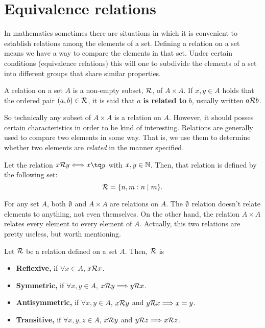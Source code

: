 \chapter{Equivalence relations}
In mathematics sometimes there are situations in which it is convenient to establish relations among the
elements of a set. Defining a relation on a set means we have a way to compare the elements in that set.
Under certain conditions (equivalence relations) this will one to subdivide the elements of a set into
different groups that share similar properties. \cite{chamizo02}

\begin{defi}[Relation]
    A relation on a set $A$ is a non-empty subset, $\mathcal{R}$, of $A\times A$. If $x, y\in A$ holds that
    the ordered pair $\left( a, b \right)\in\mathcal{R}$, it is said that $a$ \textbf{is related to} $b$, usually
    written $a\mathcal{R} b$.
\end{defi}

So technically any subset of $A\times A$ is a relation on $A$. However, it should posses certain
characteristics in order to be kind of interesting. Relations are generally used to compare two elements in
some way. That is, we use them to determine whether two elements are \textit{related} in the manner specified.

\begin{example}
   Let the relation $x\rela y\iff x\tq y$ with $x, y\in\mathbb{N}$. Then, that relation is defined by the following
   set:
   \begin{equation}
       \mathcal{R} = \{n, m : n\mid m\}.
   \end{equation}
\end{example}

\begin{remark}
    For any set $A$, both $\emptyset$ and $A\times A$ are relations on $A$. The $\emptyset$ relation doesn't relate elements to anything, not even themselves. On the other hand, the relation $A\times A$ relates every element to every element of $A$. Actually, this two relations are pretty useless, but worth mentioning.
\end{remark}

\begin{defi} \label{2:relation-props}
    Let $\mathcal{R}$ be a relation defined on a set $A$. Then, $\mathcal{R}$ is
    \begin{itemize}
        \item\textbf{Reflexive,} if $\forall x\in A$, $x\mathcal{R} x$.
        \item\textbf{Symmetric,} if $\forall x, y\in A$, $x\mathcal{R} y\Longrightarrow y\mathcal{R} x$.
        \item\textbf{Antisymmetric,} if $\forall x, y\in A$, $x\mathcal{R} y$ and $y\mathcal{R} x\Longrightarrow x = y$.
        \item\textbf{Transitive,} if $\forall x, y, z\in A$, $x\mathcal{R} y$ and $y\mathcal{R} z\Longrightarrow x\mathcal{R} z$.
    \end{itemize}
\end{defi}


